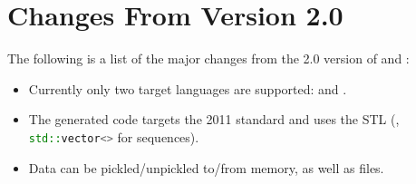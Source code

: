 \section{Changes From Version 2.0}
The following is a list of the major changes from the 2.0 version of \asdl{}
and \asdlgen{}:
\begin{itemize}
  \item
    Currently only two target languages are supported: \sml{} and \Cplusplus{}.
  \item
    The generated \Cplusplus{} code targets the 2011 standard and uses the
    STL (\eg{}, \lstinline[language=C++]!std::vector<>! for \asdl{} sequences).
  \item
    Data can be pickled/unpickled to/from memory, as well as files.
\end{itemize}%
